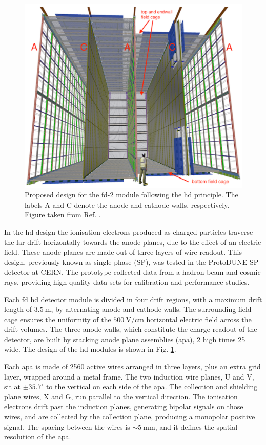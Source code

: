 \begin{figure}[t]
	\centering
	\includegraphics[width=0.65\linewidth]{Images/DUNE/FD/dune_hd}
	\caption[Proposed design for the \gls{fd}-2 module following the \gls{hd} principle.]{Proposed design for the \gls{fd}-2 module following the \gls{hd} principle. The labels A and C denote the anode and cathode walls, respectively. Figure taken from Ref. \cite{DUNE2020TDR1}.}
	\label{fig:dune_hd}
\end{figure}

In the \gls{hd} design the ionisation electrons produced as charged particles traverse the \gls{lar} drift horizontally towards the anode planes, due to the effect of an electric field. These anode planes are made out of three layers of wire readout. This design, previously known as single-phase (SP), was tested in the ProtoDUNE-SP detector at CERN. The prototype collected data from a hadron beam and cosmic rays, providing high-quality data sets for calibration and performance studies.

Each \gls{fd} \gls{hd} detector module is divided in four drift regions, with a maximum drift length of $3.5~\mathrm{m}$, by alternating anode and cathode walls. The surrounding field cage ensures the uniformity of the $500~\mathrm{V/cm}$ horizontal electric field across the drift volumes. The three anode walls, which constitute the charge readout of the detector, are built by stacking anode plane assemblies (\gls{apa}), 2 high times 25 wide. The design of the \gls{hd} modules is shown in Fig. \ref{fig:dune_hd}.

Each \gls{apa} is made of 2560 active wires arranged in three layers, plus an extra grid layer, wrapped around a metal frame. The two induction wire planes, U and V, sit at $\pm 35.7^{\circ}$ to the vertical on each side of the \gls{apa}. The collection and shielding plane wires, X and G, run parallel to the vertical direction. The ionisation electrons drift past the induction planes, generating bipolar signals on those wires, and are collected by the collection plane, producing a monopolar positive signal. The spacing between the wires is $\sim 5~\mathrm{mm}$, and it defines the spatial resolution of the \gls{apa}.

